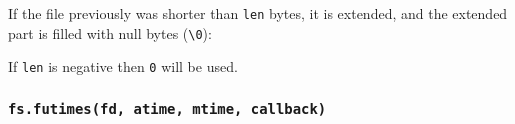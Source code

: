 \begin{Shaded}
\begin{Highlighting}[]
\OperatorTok{,}\OperatorTok{,} \OperatorTok{;}

 
  \OperatorTok{,}\KeywordTok{=\textgreater{}}\NormalTok{ \{}
    \OperatorTok{;}
\NormalTok{  \})}\OperatorTok{;}
\NormalTok{\}}

\NormalTok{(}\OperatorTok{,} \OperatorTok{,}\OperatorTok{,}\KeywordTok{=\textgreater{}}\NormalTok{ \{}
  \OperatorTok{;}

  \NormalTok{ \{}
    \OperatorTok{,} \OperatorTok{,}\KeywordTok{=\textgreater{}}\NormalTok{ \{}
      \OperatorTok{;}
      \OperatorTok{;}
\NormalTok{    \})}\OperatorTok{;}
\NormalTok{  \} }
    \OperatorTok{;}
    \OperatorTok{;}
\NormalTok{  \}}
\NormalTok{\})}\OperatorTok{;}
\end{Highlighting}
\end{Shaded}

If the file previously was shorter than \texttt{len} bytes, it is
extended, and the extended part is filled with null bytes
(\texttt{\textquotesingle{}\textbackslash{}0\textquotesingle{}}):

If \texttt{len} is negative then \texttt{0} will be used.

\subsubsection{\texorpdfstring{\texttt{fs.futimes(fd,\ atime,\ mtime,\ callback)}}{fs.futimes(fd, atime, mtime, callback)}}\label{fs.futimesfd-atime-mtime-callback}


